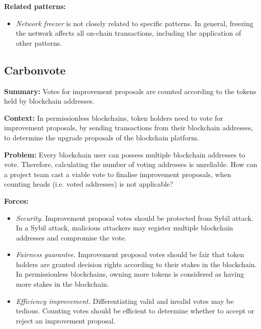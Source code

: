 \documentclass{article}
\begin{document}
\vspace{0.5em}\noindent \textbf{Related patterns:} 

\begin{itemize}
    \item \textit{Network freezer} is not closely related to specific patterns. In general, freezing the network affects all on-chain transactions, including the application of other patterns.

\end{itemize}



\subsection{Carbonvote}

\vspace{0.5em}\noindent \textbf{Summary:} Votes for improvement proposals are counted according to the tokens held by blockchain addresses.

\vspace{0.5em}\noindent \textbf{Context:} In permissionless blockchains, token holders need to vote for improvement proposals, by sending transactions from their blockchain addresses, to determine the upgrade proposals of the blockchain platform.

\vspace{0.5em}\noindent \textbf{Problem:} Every blockchain user can possess multiple blockchain addresses to vote. Therefore, calculating the number of voting addresses is unreliable. How can a project team cast a viable vote to finalise improvement proposals, when counting heads (i.e. voted addresses) is not applicable?

\vspace{0.5em}\noindent \textbf{Forces:} 

\begin{itemize}
  \item \textit{Security.} Improvement proposal votes should be protected from Sybil attack. In a Sybil attack, malicious attackers may register multiple blockchain addresses and compromise the vote.

  \item \textit{Fairness guarantee.} Improvement proposal votes should be fair that token holders are granted decision rights according to their stakes in the blockchain. In permissionless blockchains, owning more tokens is considered as having more stakes in the blockchain.

  \item \textit{Efficiency improvement.} Differentiating valid and invalid votes may be tedious. Counting votes should be efficient to determine whether to accept or reject an improvement proposal.
\end{itemize}
\end{document}
